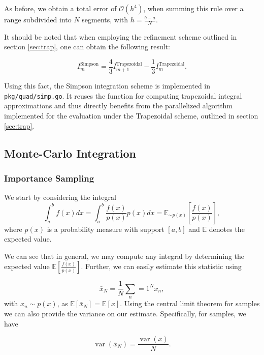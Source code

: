 \documentclass[10pt, a4paper]{article}
\begin{document}
  As before, we obtain a total error of $\mathcal{O}(h^4)$, when summing this rule over a range subdivided
  into $N$ segments, with $h = \frac{b-a}{N}$.

  It should be noted that when employing the refinement scheme outlined in section \ref{sec:trap},
  one can obtain the following result\cite{nr}:

  \begin{equation}
  I_m^{\text{Simpson}} = \frac{4}{3} I_{m+1}^{\text{Trapezoidal}} - \frac{1}{3} I_m^{\text{Trapezoidal}}.
  \end{equation}

  Using this fact, the Simpson integration scheme is implemented in \texttt{pkg/quad/simp.go}. It
  reuses the function for computing trapezoidal integral approximations and thus directly benefits from
  the parallelized algorithm implemented for the evaluation under the Trapezoidal scheme, outlined in
  section \ref{sec:trap}.

\subsection{Monte-Carlo Integration}
  \subsubsection{Importance Sampling}
  We start by considering the integral
  \begin{equation}
  \int_a^b f(x) dx = \int_{a}^{b} \frac{f(x)}{p(x)} p(x) dx = \mathbb{E}_{\sim p(x)}\left[ \frac{f(x)}{p(x)} \right],
  \end{equation}
  where $p(x)$ is a probability measure with support $[a, b]$ and $\mathbb{E}$ denotes the expected
  value.

  We can see that in general, we may compute any integral by determining the expected value
  $\mathbb{E}\left[ \frac{f(x)}{p(x)} \right]$. Further, we can easily estimate this
  statistic using

  \begin{equation}
  \bar{x}_N = \frac{1}{N} \sum_n=1^N x_n,
  \end{equation}
  with $x_n \sim p(x)$, as $\mathbb{E}[\bar{x}_N] = \mathbb{E}[x]$. Using the central limit theorem for
  \iid{} samples we can also provide the variance on our estimate. Specifically, for \iid{} samples,
  we have

  \begin{equation}
  \operatorname{var}(\bar{x}_N) = \frac{\operatorname{var}(x)}{N}.
  \end{equation}
\end{document}
